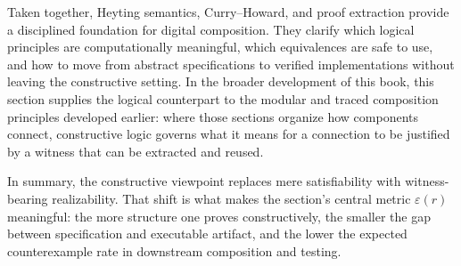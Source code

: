 Taken together, Heyting semantics, Curry--Howard, and proof extraction provide a disciplined foundation for digital composition. They clarify which logical principles are computationally meaningful, which equivalences are safe to use, and how to move from abstract specifications to verified implementations without leaving the constructive setting. In the broader development of this book, this section supplies the logical counterpart to the modular and traced composition principles developed earlier: where those sections organize how components connect, constructive logic governs what it means for a connection to be justified by a witness that can be extracted and reused.

In summary, the constructive viewpoint replaces mere satisfiability with witness-bearing realizability. That shift is what makes the section's central metric \(\varepsilon(r)\) meaningful: the more structure one proves constructively, the smaller the gap between specification and executable artifact, and the lower the expected counterexample rate in downstream composition and testing.
